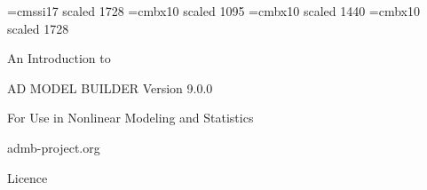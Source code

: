 %
\font\halfinch=cmssi17 scaled 1728
\font\smallheadfont=cmbx10 scaled 1095
\font\largeheadfont=cmbx10 scaled 1440
\font\hugeheadfont=cmbx10 scaled 1728


\vspace*{2in}
{\hugeheadfont
\centerline{An Introduction to}
\vspace{0.25in}
\centerline{{\halfinch AD MODEL BUILDER Version 9.0.0}}
\vspace{0.25in}
\centerline{For Use in Nonlinear Modeling and Statistics}}

\vspace{0.5in}
\centerline{admb-project.org}

\vfill
\eject

\centerline{\LARGE Licence}


\newpage

